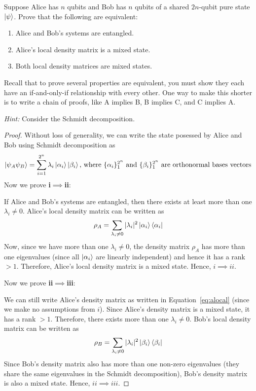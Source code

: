 \begin{solution}[label=ques:5]
  \begin{question}
    Suppose Alice has $n$ qubits and Bob has $n$ qubits of a shared $2n$-qubit pure state $\ket{\psi}$. Prove that the following are equivalent:
\begin{enumerate}[label=\roman*.]
	\item Alice and Bob's systems are entangled.
	\item Alice's local density matrix is a mixed state.
	\item Both local density matrices are mixed states.
\end{enumerate}

\noindent Recall that to prove several properties are equivalent, you must show they each have an if-and-only-if relationship with every other. One way to make this shorter is to write a chain of proofs, like A implies B, B implies C, and C implies A.

\noindent \textit{Hint:} Consider the Schmidt decomposition.
  \end{question}
  \tcblower{}
  \begin{proof}
    Without loss of generality, we can write the state posessed by Alice and Bob using Schmidt decomposition as
    \begin{equation}
      \ket{\psi_A\psi_B} = \sum_{i=1}^{2^n} \lambda_i \ket{\alpha_i}\ket{\beta_i}\text{, where $\{\alpha_i\}_1^{2^n}$ and $\{\beta_i\}_1^{2^n}$ are orthonormal bases vectors}
      \label{eq:abent}
    \end{equation}
    Now we prove \textbf{i$\implies$ii}:\par
    If Alice and Bob's systems are entangled, then there exists at least more than one $\lambda_i \neq 0$. Alice's local density matrix can be written as
    \begin{equation}
      \rho_A = \sum_{\lambda_i\neq 0} |\lambda_i|^2\ket{\alpha_i}\bra{\alpha_i}
      \label{eq:alocal}
    \end{equation}
    Now, since we have more than one $\lambda_i \neq 0$, the density matrix $\rho_A$ has more than one eigenvalues (since all $\ket{\alpha_i}$ are linearly independent) and hence it has a rank $> 1$. Therefore, Alice's local density matrix is a mixed state. Hence, $i\implies ii$.\par\bigskip

    Now we prove \textbf{ii$\implies$iii}:\par
    We can still write Alice's density matrix as written in Equation~\ref{eq:alocal} (since we make no assumptions from $i$). Since Alice's density matrix is a mixed state, it has a rank $> 1$. Therefore, there exists more than one $\lambda_i \neq 0$. Bob's local density matrix can be written as
    \begin{equation}
      \rho_B = \sum_{\lambda_i\neq 0} |\lambda_i|^2\ket{\beta_i}\bra{\beta_i}
      \label{eq:blocal}
    \end{equation}
    Since Bob's density matrix also has more than one non-zero eigenvalues (they share the same eigenvalues in the Schmidt decomposition), Bob's density matrix is also a mixed state. Hence, $ii\implies iii$.\par\bigskip


\end{proof}
\end{solution}
